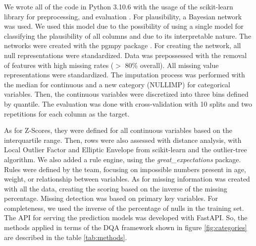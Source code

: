 We wrote all of the code in Python 3.10.6 with the usage of the scikit-learn library for preprocessing, and evaluation \cite{scikit-learn}. 
For plausibility, a Bayesian network was used. We used this model due to the possibility of using a single model for classifying the plausibility of all columns and due to its interpretable nature.
The networks were created with the pgmpy package \cite{pgmpy}. For creating the network, all null representations were standardized. Data was prepossessed with the removal of features with high missing rates ($>$ 80\% overall). All missing value representations were standardized. The imputation process was performed with the median for continuous and a new category (NULLIMP) for categorical variables. Then, the continuous variables were discretized into three bins defined by quantile. The evaluation was done with cross-validation with 10 splits and two repetitions for each column as the target. 

As for  Z-Scores, they were defined for all continuous variables based on the interquartile range. Then, rows were also assessed with distance analysis, with Local Outlier Factor and Elliptic Envelope from scikit-learn and the outlier-tree algorithm. We also added a rule engine, using the \textit{great\_expectations} package. Rules were defined by the team, focusing on impossible numbers present in age, weight, or relationship between variables. As for missing information was created with all the data, creating the scoring based on the inverse of the missing percentage. Missing detection was based on primary key variables. For completeness, we used the inverse of the percentage of nulls in the training set.
The API for serving the prediction models was developed with FastAPI. So, the methods applied in terms of the DQA framework shown in figure \ref{fig:categories} are described in the table \ref{tab:methods}.

